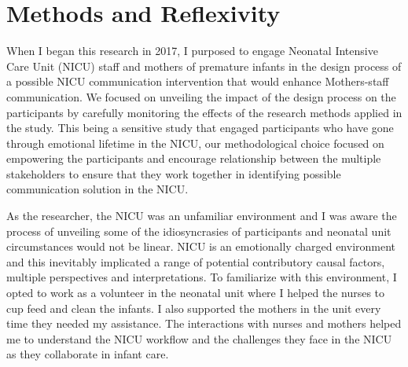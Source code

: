 
\chapter{Methods and Reflexivity} %

\label{Chapter3} %


 When I began this research in 2017, I purposed to engage Neonatal Intensive Care Unit (NICU) staff and mothers of premature infants in the design process of a possible NICU communication intervention that would enhance Mothers-staff communication. We focused on  unveiling the impact of the design process on the participants by carefully monitoring the effects of the research methods applied in the study. This being a sensitive study that engaged participants who have gone through emotional lifetime in the NICU, our methodological choice focused on empowering the participants and encourage relationship between the multiple stakeholders to ensure that they work together in identifying possible communication solution in the NICU. 
 
 As the researcher, the NICU was an unfamiliar environment and I was aware the process of unveiling some of the idiosyncrasies of participants and neonatal unit circumstances would not be linear. NICU is an emotionally charged environment and this inevitably implicated a range of potential contributory causal factors, multiple perspectives and interpretations. To familiarize with this environment, I opted to work as a volunteer in the neonatal unit where I helped the nurses to cup feed and clean the infants. I also supported the mothers in the unit every time they needed my assistance.  The interactions with nurses and mothers helped me to understand the NICU workflow and the challenges they face in the NICU as they collaborate in infant care.
 
